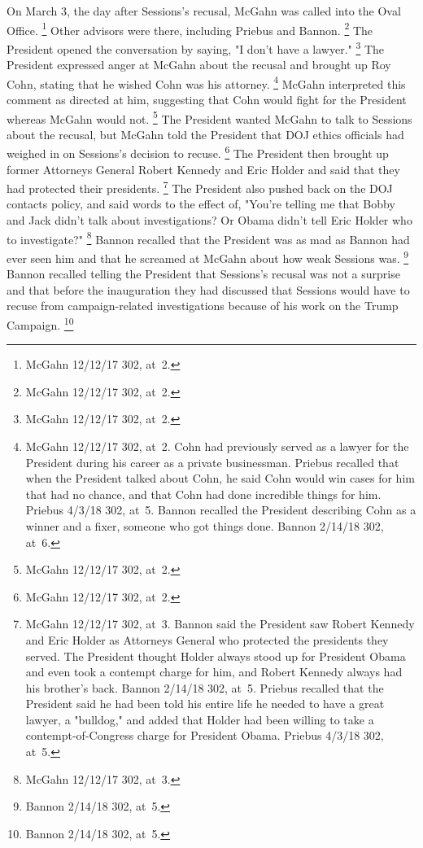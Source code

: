 On March 3, the day after Sessions's recusal, McGahn was called into the Oval Office.%
\footnote{McGahn 12/12/17 302, at~2.}
Other advisors were there, including Priebus and Bannon.%
\footnote{McGahn 12/12/17 302, at~2.}
The President opened the conversation by saying, "I don't have a lawyer."%
\footnote{McGahn 12/12/17 302, at~2.}
The President expressed anger at McGahn about the recusal and brought up Roy Cohn, stating that he wished Cohn was his attorney.%
\footnote{McGahn 12/12/17 302, at~2.
Cohn had previously served as a lawyer for the President during his career as a private businessman.
Priebus recalled that when the President talked about Cohn, he said Cohn would win cases for him that had no chance, and that Cohn had done incredible things for him.
Priebus 4/3/18 302, at~5.
Bannon recalled the President describing Cohn as a winner and a fixer, someone who got things done.
Bannon 2/14/18 302, at~6.}
McGahn interpreted this comment as directed at him, suggesting that Cohn would fight for the President whereas McGahn would not.%
\footnote{McGahn 12/12/17 302, at~2.}
The President wanted McGahn to talk to Sessions about the recusal, but McGahn told the President that DOJ ethics officials had weighed in on Sessions's decision to recuse.%
\footnote{McGahn 12/12/17 302, at~2.}
The President then brought up former Attorneys General Robert Kennedy and Eric Holder and said that they had protected their presidents.%
\footnote{McGahn 12/12/17 302, at~3.
Bannon said the President saw Robert Kennedy and Eric Holder as Attorneys General who protected the presidents they served.
The President thought Holder always stood up for President Obama and even took a contempt charge for him, and Robert Kennedy always had his brother's back.
Bannon 2/14/18 302, at~5.
Priebus recalled that the President said he had been told his entire life he needed to have a great lawyer, a "bulldog," and added that Holder had been willing to take a contempt-of-Congress charge for President Obama.
Priebus 4/3/18 302, at~5.}
The President also pushed back on the DOJ contacts policy, and said words to the effect of, "You're telling me that Bobby and Jack didn't talk about investigations?
Or Obama didn't tell Eric Holder who to investigate?"%
\footnote{McGahn 12/12/17 302, at~3.}
Bannon recalled that the President was as mad as Bannon had ever seen him and that he screamed at McGahn about how weak Sessions was.%
\footnote{Bannon 2/14/18 302, at~5.}
Bannon recalled telling the President that Sessions's recusal was not a surprise and that before the inauguration they had discussed that Sessions would have to recuse from campaign-related investigations because of his work on the Trump Campaign.%
\footnote{Bannon 2/14/18 302, at~5.}

